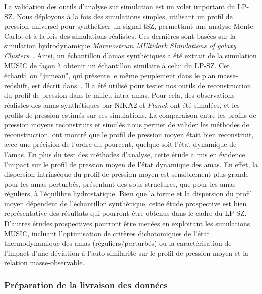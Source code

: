 La validation des outils d'analyse sur simulation est un volet
important du LP-SZ. Nous déployons à la fois des simulations simples,
utilisant un profil de pression universel pour synthétiser un signal
tSZ, permettant une analyse Monte-Carlo, et à la fois des simulations
réalistes. Ces dernières sont basées sur la simulation hydrodynamique
\emph{Marenostrum MUltidark SImulations of galaxy
  Clusters}~\citep[MUSIC][]{Sembolini2013}. Ainsi, un échantillon
d'amas synthétiques a été extrait de la simulation MUSIC de façon à
obtenir un échantillon similaire à celui du LP-SZ. Cet échantillon
``jumeau", qui présente le même peuplement dans le plan
masse-redshift, est décrit dans~\citet{Ruppin2019a}. Il a été utilisé
pour tester nos outils de reconstruction du profil de pression dans le
milieu intra-amas. Pour cela, des observations réalistes des amas
synthétiques par NIKA2 et \emph{Planck} ont été simulées, et les
profils de pression estimés sur ces simulations. La comparaison entre
les profils de pression moyens reconstruits et simulés nous permet de
valider les méthodes de reconstruction. \citet{Ruppin2019a} ont montré
que le profil de pression moyen était bien reconstruit, avec une
précision de l'ordre du pourcent, quelque soit l'état dynamique de
l'amas. En plus du test des méthodes d'analyse, cette étude a mis en
évidence l'impact sur le profil de pression moyen de l'état dynamique
des amas. En effet, la dispersion intrinsèque du profil de pression
moyen est sensiblement plus grande pour les amas perturbés, présentant
des sous-structures, que pour les amas réguliers, à l'équilibre
hydrostatique. Bien que la forme et la dispersion du profil moyen
dépendent de l'échantillon synthètique, cette étude prospective est
bien représentative des résultats qui pourront être obtenus dans le
cadre du LP-SZ. D'autres études prospectives pourront être menées en
exploitant les simulations MUSIC, incluant l'optimisation de critères
dichotomiques de l'état thermodynamique des amas
(réguliers/perturbés) ou la caractérisation de l'impact d'une déviation
à l'auto-similarité sur le profil de pression moyen et la relation
masse-observable.

\subsubsection{Préparation de la livraison des données}

